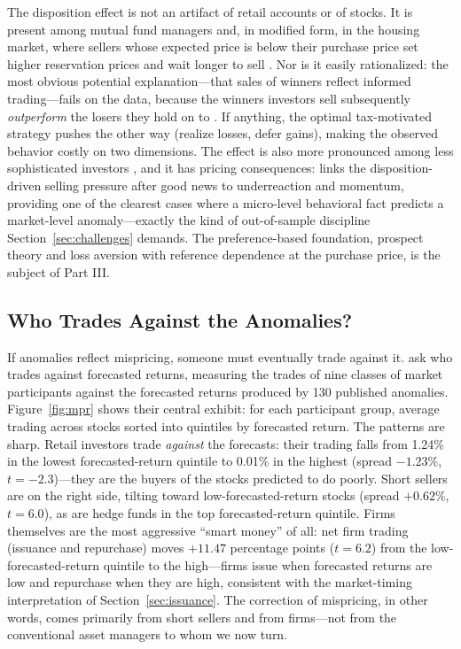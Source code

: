 The disposition effect is not an artifact of retail accounts or of stocks. It is present among mutual fund managers \citep{frazzini2006} and, in modified form, in the housing market, where sellers whose expected price is below their purchase price set higher reservation prices and wait longer to sell \citep{genesove2001}. Nor is it easily rationalized: the most obvious potential explanation---that sales of winners reflect informed trading---fails on the data, because the winners investors sell subsequently \emph{outperform} the losers they hold on to \citep{odean1998}. If anything, the optimal tax-motivated strategy pushes the other way (realize losses, defer gains), making the observed behavior costly on two dimensions. The effect is also more pronounced among less sophisticated investors \citep{dhar2006}, and it has pricing consequences: \citet{frazzini2006} links the disposition-driven selling pressure after good news to underreaction and momentum, providing one of the clearest cases where a micro-level behavioral fact predicts a market-level anomaly---exactly the kind of out-of-sample discipline Section~\ref{sec:challenges} demands. The preference-based foundation, prospect theory and loss aversion with reference dependence at the purchase price, is the subject of Part III.

\subsection{Who Trades Against the Anomalies?}
\label{sec:smartmoney}

If anomalies reflect mispricing, someone must eventually trade against it. \citet{mclean2025} ask who trades against forecasted returns, measuring the trades of nine classes of market participants against the forecasted returns produced by 130 published anomalies. Figure~\ref{fig:mpr} shows their central exhibit: for each participant group, average trading across stocks sorted into quintiles by forecasted return. The patterns are sharp. Retail investors trade \emph{against} the forecasts: their trading falls from 1.24\% in the lowest forecasted-return quintile to 0.01\% in the highest (spread $-1.23\%$, $t=-2.3$)---they are the buyers of the stocks predicted to do poorly. Short sellers are on the right side, tilting toward low-forecasted-return stocks (spread $+0.62\%$, $t=6.0$), as are hedge funds in the top forecasted-return quintile. Firms themselves are the most aggressive ``smart money'' of all: net firm trading (issuance and repurchase) moves $+11.47$ percentage points ($t=6.2$) from the low-forecasted-return quintile to the high---firms issue when forecasted returns are low and repurchase when they are high, consistent with the market-timing interpretation of Section~\ref{sec:issuance}. The correction of mispricing, in other words, comes primarily from short sellers and from firms---not from the conventional asset managers to whom we now turn.

